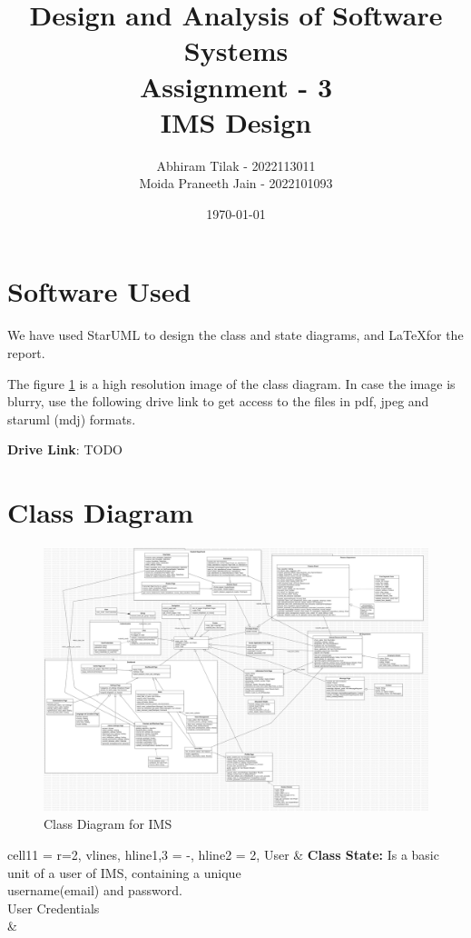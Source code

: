 \documentclass[11pt]{article}
\title{ Design and Analysis of Software Systems \\ Assignment - 3 \\ IMS Design}
\author{ Abhiram Tilak - 2022113011 \\ Moida Praneeth Jain - 2022101093 }
\date{\today}
\begin{document}
\maketitle

\section{Software Used}

We have used StarUML to design the class and state diagrams,
and \LaTeX  for the report.

The figure \ref{class} is a high resolution image of the class diagram. In case the image is blurry, 
use the following drive link to get access to the files in pdf, jpeg and staruml (mdj) formats.

\textbf{Drive Link}: TODO


\section{Class Diagram}

\pagebreak

\begin{figure}[!ht]
    \center
\includegraphics[width=8in,angle=90]{class_diagram/Main.png}
\caption{Class Diagram for IMS}
\label{class}
\end{figure}

\pagebreak

\begin{longtblr}[
  label = none,
  entry = none,
]{
  cell{1}{1} = {r=2}{},
  vlines,
  hline{1,3} = {-}{},
  hline{2} = {2}{},
}
User & {\textbf{Class State: }Is a basic unit of a user of IMS, containing a unique\\ username(email)
and password.\\\hspace{\dimexpr\labelsep+0.5\tabcolsep}User Credentials} \\
     &
\end{longtblr}
\end{document}
